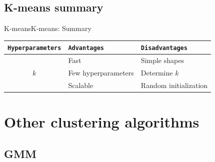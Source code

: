 \documentclass[10pt,compress]{beamer} %
\begin{document}
\subsection{K-means summary}
\begin{frame}[fragile]{K-means}{K-means: Summary}
	\begin{center}
	\begin{tabular}{cll}\hline
	 	\texttt{Hyperparameters}  & \texttt{Advantages}  & \texttt{Disadvantages} \\\hline
	 	                 & Fast                 & Simple shapes \\
	    $k$	             & Few hyperparameters  & Determine $k$ \\
	 	                 & Scalable             & Random initialization \\
	 	\hline
	\end{tabular}
	\end{center}
\end{frame}


\section{Other clustering algorithms}

\subsection{GMM}
\end{document}
